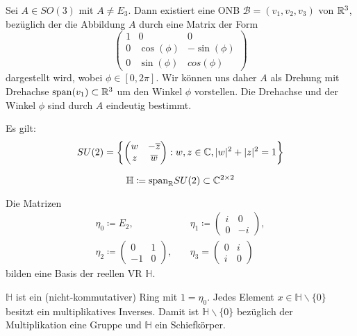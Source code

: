 \documentclass{cheat-sheet}
\newcommand{\HH}{\mathbb{H}}
\newcommand{\BB}{\mathcal{B}}
\begin{document}
\begin{satz}
  Sei $A \in SO(3)$ mit $A \not= E_3$. Dann existiert eine ONB $\BB = (v_1, v_2, v_3)$ von $\mathbb{R}^3$, bezüglich der die Abbildung $A$ durch eine Matrix der Form
  \[ \begin{pmatrix}
  1 & 0 & 0 \\
  0 & \cos(\phi) & - \sin(\phi) \\
  0 & \sin(\phi) & cos(\phi)
  \end{pmatrix} \]
  dargestellt wird, wobei $\phi \in [0, 2 \pi]$. Wir können uns daher $A$ als Drehung mit Drehachse $\mathrm{span}(v_1) \subset \mathbb{R}^3$ um den Winkel $\phi$ vorstellen. Die Drehachse und der Winkel $\phi$ sind durch $A$ eindeutig bestimmt.
\end{satz}


\begin{satz}
  Es gilt:
  \[ SU(2) = \left\{ \begin{pmatrix}
  w & - \overline{z} \\
  z & \overline{w}
  \end{pmatrix} : w, z \in \mathbb{C}, \lvert w\rvert^2 + \lvert z\rvert^2 = 1 \right\} \]
\end{satz}

\begin{defn}
  \[ \HH \coloneqq \mathrm{span}_{\R} SU(2) \subset \C^{2 \times 2} \]
\end{defn}

\begin{satz}
  Die Matrizen
  \begin{align*}
  \eta_0 \coloneqq E_2, \quad & \eta_1 \coloneqq \begin{pmatrix} i & 0 \\ 0 & -i \end{pmatrix}, \\
  \eta_2 \coloneqq \begin{pmatrix} 0 & 1 \\ -1 & 0 \end{pmatrix}, \quad & \eta_3 = \begin{pmatrix} 0 & i \\ i & 0 \end{pmatrix}
  \end{align*}
  bilden eine Basis der reellen VR $\mathbb{H}$.
\end{satz}

\begin{satz}
  $\HH$ ist ein (nicht-kommutativer) Ring mit $1 = \eta_0$. Jedes Element $x \in \HH \backslash \{ 0 \}$ besitzt ein multiplikatives Inverses. Damit ist $\HH \backslash \{ 0 \}$ bezüglich der Multiplikation eine Gruppe und $\HH$ ein Schiefkörper.
\end{satz}
\end{document}
